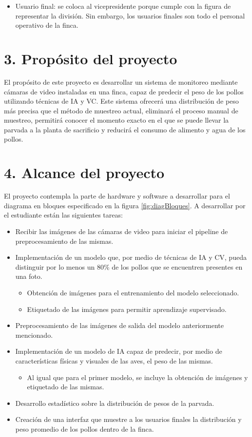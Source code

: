 \documentclass[
11pt, %
]{charter}
\begin{document}
\begin{itemize}
	\item Usuario final: se coloca al vicepresidente porque cumple con la figura de representar la división. Sin embargo, los usuarios finales son todo el personal operativo de la finca.
\end{itemize}

\section{3. Propósito del proyecto}
\label{sec:proposito}
El propósito de este proyecto es desarrollar un sistema de monitoreo mediante cámaras de video instaladas en una finca, capaz de predecir el peso de los pollos utilizando técnicas de IA y VC. Este sistema ofrecerá una distribución de peso más precisa que el método de muestreo actual, eliminará el proceso manual de muestreo, permitirá conocer el momento exacto en el que se puede llevar la parvada a la planta de sacrificio y reducirá el consumo de alimento y agua de los pollos.

\section{4. Alcance del proyecto}
\label{sec:alcance}
El proyecto contempla la parte de hardware y software a desarrollar para el diagrama en bloques especificado en la figura \ref{fig:diagBloques}. A desarrollar por el estudiante están las siguientes tareas:

\begin{itemize}
\item Recibir las imágenes de las cámaras de video para iniciar el pipeline de preprocesamiento de las mismas.
\item Implementación de un modelo que, por medio de técnicas de IA y CV, pueda distinguir por lo menos un 80\% de los pollos que se encuentren presentes en una foto.
	\begin{itemize}
	\item Obtención de imágenes para el entrenamiento del modelo seleccionado.
	\item Etiquetado de las imágenes para permitir aprendizaje supervisado.
	\end{itemize}
\item Preprocesamiento de las imágenes de salida del modelo anteriormente mencionado.
\item Implementación de un modelo de IA capaz de predecir, por medio de características físicas y visuales de las aves, el peso de las mismas.
	\begin{itemize}
	\item Al igual que para el primer modelo, se incluye la obtención de imágenes y etiquetado de las mismas.
	\end{itemize}
\item Desarrollo estadístico sobre la distribución de pesos de la parvada.
\item Creación de una interfaz que muestre a los usuarios finales la distribución y peso promedio de los pollos dentro de la finca.
\end{itemize}
\end{document}
